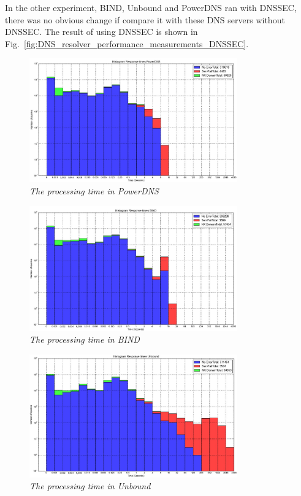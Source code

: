 In the other experiment, BIND, Unbound and PowerDNS ran with DNSSEC, there was no obvious change if compare it with these DNS servers without DNSSEC. The result of using DNSSEC is shown in Fig.~\ref{fig:DNS_resolver_performance_measurements_DNSSEC}.
\\

\begin{figure}[hbt!]  
    \centering
    \includegraphics[width=0.8\textwidth]{figure/Measurement-PowerDNS.jpg}
    \caption{\em The processing time in PowerDNS \cite{DNS_resolver_performance_measurements} \label{fig:Measurements_PowerDNS}}
\end{figure}


\begin{figure}[hbt!]  
    \centering
    \includegraphics[width=0.8\textwidth]{figure/Measurement-BIND.jpg}
    \caption{\em The processing time in BIND \cite{DNS_resolver_performance_measurements} \label{fig:Measurement_BIND}}
\end{figure}


\begin{figure}[hbt!]  
    \centering
    \includegraphics[width=0.8\textwidth]{figure/Measurement-Unbound.jpg}
    \caption{\em The processing time in Unbound \cite{DNS_resolver_performance_measurements} \label{fig:Measurement_Unbound}}
\end{figure}


